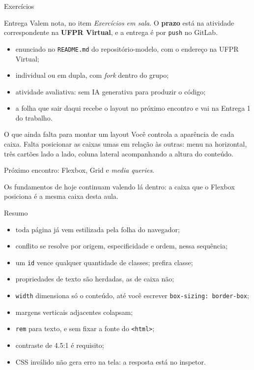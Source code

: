 \documentclass{beamer}
\begin{document}
\begin{frame}{Exercícios}
	\begin{block}{Entrega}
		Valem nota, no item \emph{Exercícios em sala}. O \textbf{prazo} está na
		atividade correspondente na \textbf{UFPR Virtual}, e a entrega é por
		\texttt{push} no GitLab.
	\end{block}

	\vspace{0.4cm}
	\begin{itemize}
		\item enunciado no \texttt{README.md} do repositório-modelo, com o endereço
		      na UFPR Virtual;
		\item individual ou em dupla, com \emph{fork} dentro do grupo;
		\item atividade avaliativa: sem IA generativa para produzir o código;
		\item a folha que sair daqui recebe o layout no próximo encontro e vai na
		      Entrega 1 do trabalho.
	\end{itemize}
\end{frame}

\begin{frame}{O que ainda falta para montar um layout}
	Você controla a aparência de cada caixa. Falta posicionar as caixas umas em
	relação às outras: menu na horizontal, três cartões lado a lado, coluna lateral
	acompanhando a altura do conteúdo.

	\vspace{0.4cm}
	Próximo encontro: Flexbox, Grid e \emph{media queries}.

	\vspace{0.3cm}
	Os fundamentos de hoje continuam valendo lá dentro: a caixa que o Flexbox
	posiciona é a mesma caixa desta aula.
\end{frame}

\begin{frame}{Resumo}
	\begin{itemize}
		\item toda página já vem estilizada pela folha do navegador;
		\item conflito se resolve por origem, especificidade e ordem, nessa sequência;
		\item um \texttt{id} vence qualquer quantidade de classes; prefira classe;
		\item propriedades de texto são herdadas, as de caixa não;
		\item \texttt{width} dimensiona só o conteúdo, até você escrever
		      \texttt{box-sizing: border-box};
		\item margens verticais adjacentes colapsam;
		\item \texttt{rem} para texto, e sem fixar a fonte do \texttt{<html>};
		\item contraste de 4.5:1 é requisito;
		\item CSS inválido não gera erro na tela: a resposta está no inspetor.
	\end{itemize}
\end{frame}
\end{document}
